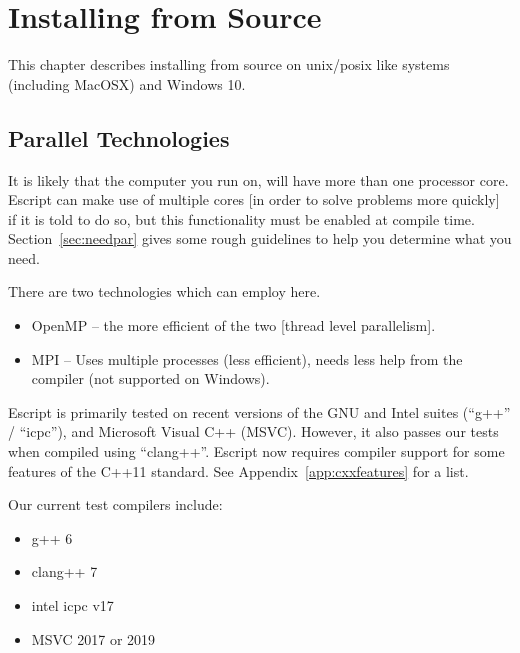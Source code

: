%
%
%


\chapter{Installing from Source}\label{chap:source}

This chapter describes installing \escript from source on unix/posix like
systems (including MacOSX) and Windows 10.

\section{Parallel Technologies}\label{sec:par}
It is likely that the computer you run \escript on, will have more than one processor core.
Escript can make use of multiple cores [in order to solve problems more quickly] if it is told to do so,
but this functionality must be enabled at compile time.
Section~\ref{sec:needpar} gives some rough guidelines to help you determine what you need.

There are two technologies which \escript can employ here.
\begin{itemize}
 \item OpenMP -- the more efficient of the two [thread level parallelism].
 \item MPI -- Uses multiple processes (less efficient), needs less help from
   the compiler (not supported on Windows).
\end{itemize}

Escript is primarily tested on recent versions of the GNU and Intel suites
(``g++'' / ``icpc''), and Microsoft Visual C++ (MSVC).  However, it also passes
our tests when compiled using ``clang++''.  Escript now requires compiler
support for some features of the C++11 standard.  See
Appendix~\ref{app:cxxfeatures} for a list.


Our current test compilers include:
\begin{itemize}
 \item g++ 6
 \item clang++ 7
 \item intel icpc v17
 \item MSVC 2017 or 2019
\end{itemize}

